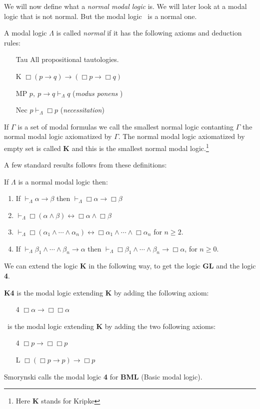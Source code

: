 \documentclass[../main.tex]{subfiles}
\begin{document}
We will now define what a \textit{normal modal logic} is. We will later look at
a modal logic that is not normal. But the modal logic \GL\ is a normal one.
\begin{defi}
	A modal logic $\Lambda$ is called \textit{normal} if it has the following
	axioms and deduction rules:
	\begin{enumerate}
		\item[Tau] All propositional tautologies. 
		\item[K] $\Box(p\rightarrow q)\rightarrow(\Box p\rightarrow\Box
			q)$
		\item[MP] $p,\ p\rightarrow q \vdash_\Lambda q$
			(\textit{modus ponens} )
		\item[Nec] $p \vdash_\Lambda\Box p$ (\textit{necessitation})
	\end{enumerate}
	If $\Gamma$ is a set of modal formulas we call the smallest normal
	logic contanting $\Gamma$ the normal modal logic axiomatized by
	$\Gamma$. The normal modal logic axiomatized by empty set is called
	\textbf{K} and
	this is the smallest normal modal logic.\footnote{Here \textbf{K}
	stands for Kripke}
\end{defi}
A few standard results follows from these definitions:
\begin{prop}
	If $\Lambda$ is a normal modal logic then:
	\begin{enumerate}
		\item If $\vdash_\Lambda\alpha\rightarrow\beta$ then
		$\vdash_\Lambda\Box\alpha\rightarrow\Box\beta$
	\item
		$\vdash_\Lambda\Box(\alpha\wedge\beta)\leftrightarrow\Box\alpha\wedge\Box\beta$
	\item
		$\vdash_\Lambda\Box(\alpha_1\wedge\cdots\wedge\alpha_n)\leftrightarrow
		\Box\alpha_1\wedge\cdots\wedge\Box\alpha_n$ for $n\geq 2$.
	\item If
		$\vdash_\Lambda\beta_1\wedge\cdots\wedge\beta_n\rightarrow\alpha$
		then
		$\vdash_\Lambda\Box\beta_1\wedge\cdots\wedge\beta_n\rightarrow\Box\alpha$,
		for $n\geq 0$.
	\end{enumerate}
\end{prop}
We can extend the logic \textbf{K} in the following way, to get the logic
\textbf{GL} and the logic \textbf{4}.
\begin{defi}
	\textbf{K4} is the modal logic extending \textbf{K} by adding the
	following axiom:
	\begin{enumerate}
		\item[4] $\Box\alpha\rightarrow\Box\Box\alpha$
	\end{enumerate}
	\GL\ is the modal logic extending \textbf{K} by adding the two following
	axioms:
	\begin{enumerate}
		\item[4] $\Box p\rightarrow\Box\Box p$
		\item[L]
			$\Box(\Box p\rightarrow p)\rightarrow\Box p$
	\end{enumerate}
\end{defi}
Smorynski calls the modal logic \textbf{4} for \textbf{BML} (Basic modal
logic).
\end{document}
